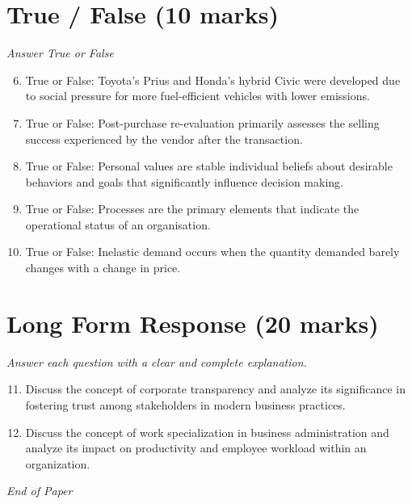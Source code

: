\documentclass[12pt]{article}
\begin{document}
\section*{True / False (10 marks)}
\textit{Answer True or False}
\begin{enumerate}[label=\arabic*.]
\setcounter{enumi}{5}
\item True or False: Toyota's Prius and Honda's hybrid Civic were developed due to social pressure for more fuel-efficient vehicles with lower emissions.
\item True or False: Post-purchase re-evaluation primarily assesses the selling success experienced by the vendor after the transaction.
\item True or False: Personal values are stable individual beliefs about desirable behaviors and goals that significantly influence decision making.
\item True or False: Processes are the primary elements that indicate the operational status of an organisation.
\item True or False: Inelastic demand occurs when the quantity demanded barely changes with a change in price.
\end{enumerate}

\section*{Long Form Response (20 marks)}
\textit{Answer each question with a clear and complete explanation.}
\begin{enumerate}[label=\arabic*.]
\setcounter{enumi}{10}
\item Discuss the concept of corporate transparency and analyze its significance in fostering trust among stakeholders in modern business practices.
\item Discuss the concept of work specialization in business administration and analyze its impact on productivity and employee workload within an organization.
\end{enumerate}

\vfill
\noindent\textit{End of Paper}
\end{document}
